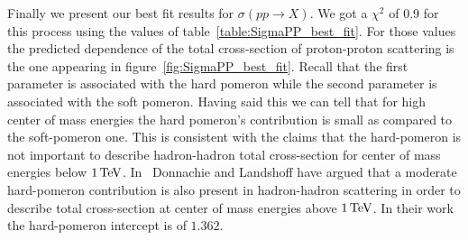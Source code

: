 \documentclass[preprint, 12pt]{elsarticle}
\begin{document}


Finally we present our best fit results for $\sigma\left(p p \rightarrow X\right)$. We got a $\chi^2$ of 0.9 for this process using the values of table~\ref{table:SigmaPP_best_fit}. For those values the predicted dependence of the total cross-section of proton-proton scattering is the one appearing in figure~\ref{fig:SigmaPP_best_fit}. Recall that the first parameter is associated with the hard pomeron while the second parameter is associated with the soft pomeron. Having said this we can tell that for high center of mass energies the hard pomeron's contribution is small as compared to the soft-pomeron one. This is consistent with the claims that the hard-pomeron is not important to describe hadron-hadron total cross-section for center of mass energies below $1 {\rm \, TeV}$. In~\cite{Donnachie:2011aa} Donnachie and Landshoff have argued that a moderate hard-pomeron contribution is also present in hadron-hadron scattering in order to describe total cross-section at center of mass energies above $1 {\rm \, TeV}$. In their work the hard-pomeron intercept is of $1.362$.
\end{document}
